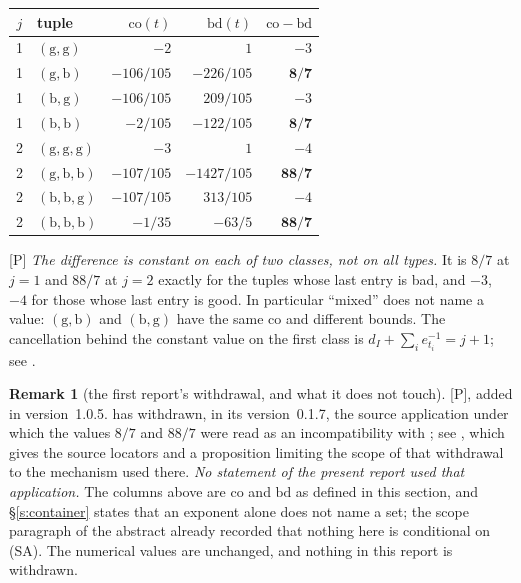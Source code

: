 \documentclass[11pt]{article}
\theoremstyle{plain}
\theoremstyle{definition}
\newtheorem{remark}{Remark}
\newcommand{\SA}{\textup{(SA)}}
\begin{document}
\begin{center}
\begin{tabular}{clrrr}
\toprule
$j$ & tuple & $\mathrm{co}(t)$ & $\mathrm{bd}(t)$ & $\mathrm{co}-\mathrm{bd}$\\
\midrule
1 & $(\mathrm g,\mathrm g)$ & $-2$ & $1$ & $-3$\\
1 & $(\mathrm g,\mathrm b)$ & $-106/105$ & $-226/105$ & $\mathbf{8/7}$\\
1 & $(\mathrm b,\mathrm g)$ & $-106/105$ & $209/105$ & $-3$\\
1 & $(\mathrm b,\mathrm b)$ & $-2/105$ & $-122/105$ & $\mathbf{8/7}$\\
\midrule
2 & $(\mathrm g,\mathrm g,\mathrm g)$ & $-3$ & $1$ & $-4$\\
2 & $(\mathrm g,\mathrm b,\mathrm b)$ & $-107/105$ & $-1427/105$ & $\mathbf{88/7}$\\
2 & $(\mathrm b,\mathrm b,\mathrm g)$ & $-107/105$ & $313/105$ & $-4$\\
2 & $(\mathrm b,\mathrm b,\mathrm b)$ & $-1/35$ & $-63/5$ & $\mathbf{88/7}$\\
\bottomrule
\end{tabular}
\end{center}

\textup{[P]} \emph{The difference is constant on each of two classes, not on all
types.}  It is $8/7$ at $j=1$ and $88/7$ at $j=2$ exactly for the tuples whose last
entry is bad, and $-3$, $-4$ for those whose last entry is good.  In particular
``mixed'' does not name a value: $(\mathrm g,\mathrm b)$ and $(\mathrm b,\mathrm g)$
have the same $\mathrm{co}$ and different bounds.  The cancellation behind the constant value on
the first class is $d_I+\sum_ie_{t_i}^{-1}=j+1$; see \cite[\S6]{First}.

\begin{remark}[the first report's withdrawal, and what it does not touch]
\label{r:firstwithdrawal}
\textup{[P], added in version~1.0.5.}  \cite{First} has withdrawn, in its
version~0.1.7, the source application under which the values $8/7$ and $88/7$
were read as an incompatibility with \cite{IUT4}; see \cite[\S7]{First}, which
gives the source locators and a proposition limiting the scope of that
withdrawal to the mechanism used there.  \emph{No statement of the present report
used that application.}  The columns above are $\mathrm{co}$ and $\mathrm{bd}$ as
defined in this section, and \S\ref{s:container} states that an exponent alone
does not name a set; the scope paragraph of the abstract already recorded that
nothing here is conditional on \SA{}.  The numerical values are unchanged, and
nothing in this report is withdrawn.
\end{remark}
\end{document}
